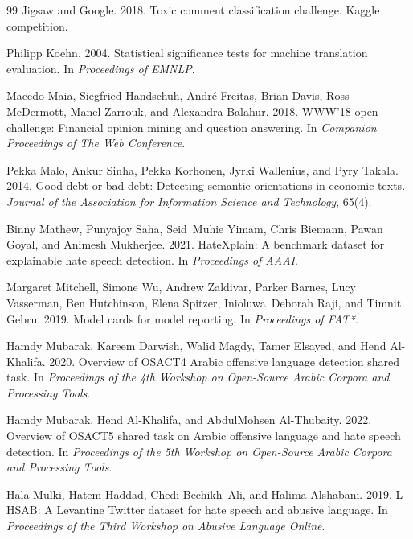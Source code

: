 \documentclass[11pt,a4paper,twocolumn]{article}
\begin{document}
\begin{thebibliography}{99}
Jigsaw and Google. 2018.
\newblock Toxic comment classification challenge.
\newblock Kaggle competition.

Philipp Koehn. 2004.
\newblock Statistical significance tests for machine translation evaluation.
\newblock In \emph{Proceedings of EMNLP}.

Macedo Maia, Siegfried Handschuh, Andr{\'e} Freitas, Brian Davis, Ross McDermott, Manel
  Zarrouk, and Alexandra Balahur. 2018.
\newblock WWW'18 open challenge: Financial opinion mining and question answering.
\newblock In \emph{Companion Proceedings of The Web Conference}.

Pekka Malo, Ankur Sinha, Pekka Korhonen, Jyrki Wallenius, and Pyry Takala. 2014.
\newblock Good debt or bad debt: Detecting semantic orientations in economic texts.
\newblock \emph{Journal of the Association for Information Science and Technology},
  65(4).

Binny Mathew, Punyajoy Saha, Seid~Muhie Yimam, Chris Biemann, Pawan Goyal, and Animesh
  Mukherjee. 2021.
\newblock HateXplain: A benchmark dataset for explainable hate speech detection.
\newblock In \emph{Proceedings of AAAI}.

Margaret Mitchell, Simone Wu, Andrew Zaldivar, Parker Barnes, Lucy Vasserman, Ben
  Hutchinson, Elena Spitzer, Inioluwa~Deborah Raji, and Timnit Gebru. 2019.
\newblock Model cards for model reporting.
\newblock In \emph{Proceedings of FAT*}.

Hamdy Mubarak, Kareem Darwish, Walid Magdy, Tamer Elsayed, and Hend Al-Khalifa. 2020.
\newblock Overview of OSACT4 Arabic offensive language detection shared task.
\newblock In \emph{Proceedings of the 4th Workshop on Open-Source Arabic Corpora and
  Processing Tools}.

Hamdy Mubarak, Hend Al-Khalifa, and AbdulMohsen Al-Thubaity. 2022.
\newblock Overview of OSACT5 shared task on Arabic offensive language and hate speech
  detection.
\newblock In \emph{Proceedings of the 5th Workshop on Open-Source Arabic Corpora and
  Processing Tools}.

Hala Mulki, Hatem Haddad, Chedi Bechikh~Ali, and Halima Alshabani. 2019.
\newblock L-HSAB: A Levantine Twitter dataset for hate speech and abusive language.
\newblock In \emph{Proceedings of the Third Workshop on Abusive Language Online}.


\end{thebibliography}
\end{document}
